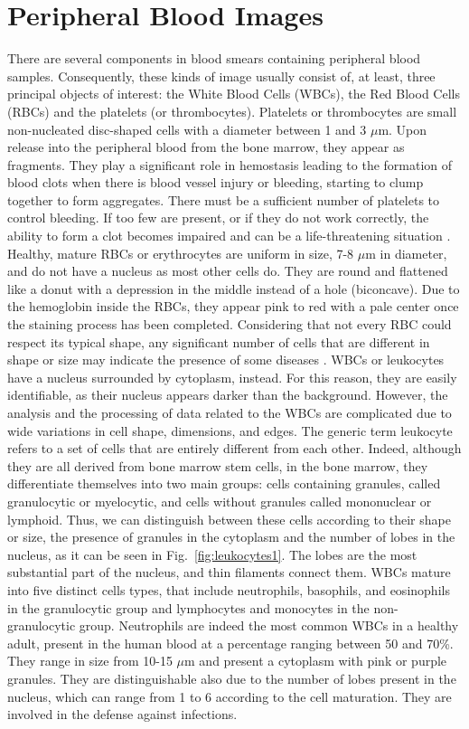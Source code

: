 \section{Peripheral Blood Images}
There are several components in blood smears containing peripheral blood samples. Consequently, these kinds of image usually consist of, at least, three principal objects of interest: the White Blood Cells (\acs{WBC}s), the Red Blood Cells (\acs{RBC}s) and the platelets (or thrombocytes). 
Platelets or thrombocytes are small non-nucleated disc-shaped cells with a diameter between 1 and 3 $\mu$m. Upon release into the peripheral blood from the bone marrow, they appear as fragments. They play a significant role in hemostasis leading to the formation of blood clots when there is blood vessel injury or bleeding, starting to clump together to form aggregates. There must be a sufficient number of platelets to control bleeding. If too few are present, or if they do not work correctly, the ability to form a clot becomes impaired and can be a life-threatening situation \cite{Ciesla}. Healthy, mature RBCs or erythrocytes are uniform in size, 7-8 $\mu$m in diameter,  and do not have a nucleus as most other cells do. They are round and flattened like a donut with a depression in the middle instead of a hole (biconcave). Due to the hemoglobin inside the RBCs, they appear pink to red with a pale center once the staining process has been completed. Considering that not every RBC could respect its typical shape, any significant number of cells that are different in shape or size may indicate the presence of some diseases \cite{Erhabor}. WBCs or leukocytes have a nucleus surrounded by cytoplasm, instead. For this reason, they are easily identifiable, as their nucleus appears darker than the background. However, the analysis and the processing of data related to the WBCs are complicated due to wide variations in cell shape, dimensions, and edges. The generic term leukocyte refers to a set of cells that are entirely different from each other. Indeed, although they are all derived from bone marrow stem cells, in the bone marrow, they differentiate themselves into two main groups: cells containing granules, called granulocytic or myelocytic, and cells without granules called mononuclear or lymphoid. Thus, we can distinguish between these cells according to their shape or size, the presence of granules in the cytoplasm and the number of lobes in the nucleus, as it can be seen in Fig.~\ref{fig:leukocytes1}. The lobes are the most substantial part of the nucleus, and thin filaments connect them. WBCs mature into five distinct cells types, that include neutrophils, basophils, and eosinophils in the granulocytic group and lymphocytes and monocytes in the non-granulocytic group. Neutrophils are indeed the most common WBCs in a healthy adult, present in the human blood at a percentage ranging between 50 and 70\%. They range in size from 10-15 $\mu$m and present a cytoplasm with pink or purple granules. They are distinguishable also due to the number of lobes present in the nucleus, which can range from 1 to 6 according to the cell maturation. They are involved in the defense against infections.
